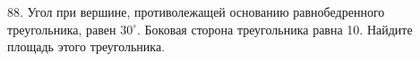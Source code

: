 88. Угол при вершине, противолежащей основанию равнобедренного треугольника, равен $30^\circ.$ Боковая сторона треугольника равна 10. Найдите площадь этого треугольника.\\
